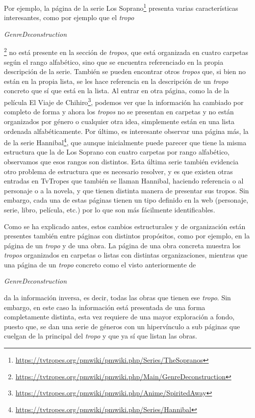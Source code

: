 Por ejemplo, la página de la serie Los
Soprano\footnote{\url{https://tvtropes.org/pmwiki/pmwiki.php/Series/TheSopranos}}
presenta varias características interesantes, como por ejemplo que el
\textit{tropo}
\begin{otherlanguage}{english}\textit{GenreDeconstruction}\end{otherlanguage}\footnote{\url{https://tvtropes.org/pmwiki/pmwiki.php/Main/GenreDeconstruction}}
no está presente en la sección de \textit{tropos}, que está organizada en cuatro
carpetas según el rango alfabético, sino que se encuentra referenciado en la
propia descripción de la serie. También se pueden encontrar otros
\textit{tropos} que, si bien no están en la propia lista, se les hace referencia
en la descripción de un \textit{tropo} concreto que sí que está en la lista. Al
entrar en otra página, como la de la película El Viaje de
Chihiro\footnote{\url{https://tvtropes.org/pmwiki/pmwiki.php/Anime/SpiritedAway}},
podemos ver que la información ha cambiado por completo de forma y ahora los
\textit{tropos} no se presentan en carpetas y no están organizados por género o
cualquier otra idea, simplemente están en una lista ordenada alfabéticamente.
Por último, es interesante observar una página más, la de la serie
Hannibal\footnote{\url{https://tvtropes.org/pmwiki/pmwiki.php/Series/Hannibal}},
que aunque inicialmente puede parecer que tiene la misma estructura que la de
Los Soprano con cuatro carpetas por rango alfabético, observamos que esos rangos
son distintos. Esta última serie también evidencia otro problema de estructura
que es necesario resolver, y es que existen otras entradas en TvTropes que
también se llaman Hannibal, haciendo referencia o al personaje o a la novela, y
que tienen distinta manera de presentar sus tropos. Sin embargo, cada una de
estas páginas tienen un tipo definido en la web (personaje, serie, libro,
película, etc.) por lo que son más fácilmente identificables.

Como se ha explicado antes, estos cambios estructurales y de organización están
presentes también entre páginas con distintos propósitos, como por ejemplo, en
la página de un \textit{tropo} y de una obra. La página de una obra concreta
muestra los \textit{tropos} organizados en carpetas o listas con distintas
organizaciones, mientras que una página de un \textit{tropo} concreto como el
visto anteriormente de
\begin{otherlanguage}{english}\textit{GenreDeconstruction}\end{otherlanguage} da
la información inversa, es decir, todas las obras que tienen ese \textit{tropo}.
Sin embargo, en este caso la información está presentada de una forma
completamente distinta, esta vez requiere de una mayor exploración a fondo,
puesto que, se dan una serie de géneros con un hipervínculo a sub páginas que
cuelgan de la principal del \textit{tropo} y que ya sí que listan las obras.

